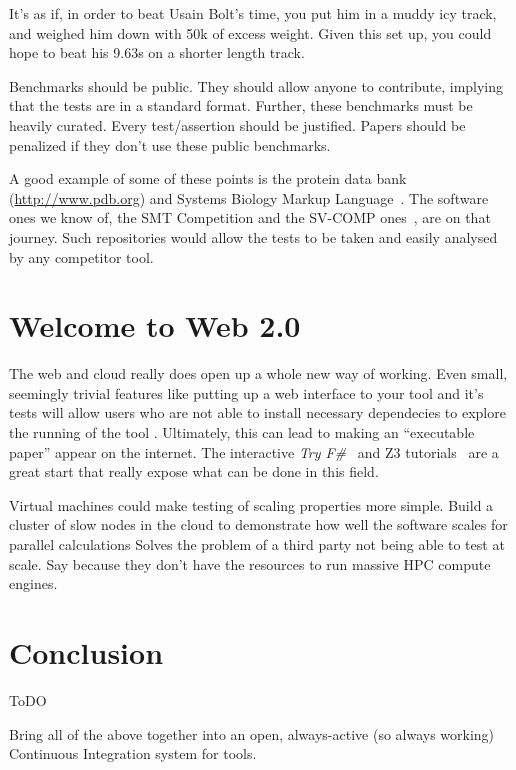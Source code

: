\documentclass[conference]{IEEEtran}
\begin{document}
It's as if, in order to beat Usain Bolt's time, you put him in a muddy
icy track, and weighed him down with 50k of excess weight. Given this
set up, you could hope to beat his 9.63s on a shorter length track.

Benchmarks should be public. They should allow anyone to contribute,
implying that the tests are in a standard format. Further, these
benchmarks must be heavily curated. Every test/assertion should be
justified. Papers should be penalized if they don't use these public
benchmarks.

A good example of some of these points is the protein data bank
(\url{http://www.pdb.org}) and Systems Biology Markup
Language~\cite{Hucka2003,Chaouiya2013}. The software ones we know of,
the SMT Competition and the SV-COMP ones~\cite{SMTComp2014,
  SVCOMP2015}, are on that journey. Such repositories would
allow the tests to be taken and easily analysed by any competitor
tool.

\section{Welcome to Web 2.0} 

The web and cloud really does open up a whole new way of working. Even
small, seemingly trivial features like putting up a web interface to
your tool and it's tests will allow users who are not able to install
necessary dependecies to explore the running of the tool
\cite{Hall2014}. Ultimately, this can lead to making an ``executable
paper'' appear on the internet. The interactive {\em Try
  F\#}~\cite{tryFsharp} and Z3 tutorials~\cite{Z3tutorial} are a great
start that really expose what can be done in this field.



Virtual machines could make testing of scaling properties more simple. 
Build a cluster of slow nodes in the cloud to demonstrate how well the
software scales for parallel calculations
%
Solves the problem of a third party not being able to test at
scale. Say because they don't have the resources to run massive HPC
compute engines.


\section{Conclusion}
\label{sec:Conclusion} 

ToDO 

Bring all of the above together into an open, always-active (so always
working) Continuous Integration system for tools. 
\end{document}
